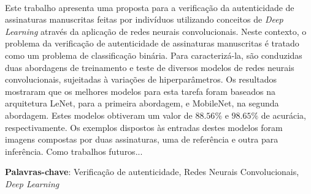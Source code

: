 \ \ \\[2cm]
Este trabalho apresenta uma proposta para a verificação da autenticidade de assinaturas manuscritas feitas por indivíduos utilizando conceitos de \emph{Deep Learning} através da aplicação de redes neurais convolucionais. Neste contexto, o problema da verificação de autenticidade de assinaturas manuscritas é tratado como um problema de classificação binária. Para caracterizá-la, são conduzidas duas abordagens de treinamento e teste de diversos modelos de redes neurais convolucionais, sujeitadas à variações de hiperparâmetros. Os resultados mostraram que os melhores modelos para esta tarefa foram baseados na arquitetura LeNet, para a primeira abordagem, e MobileNet, na segunda abordagem. Estes modelos obtiveram um valor de $88.56\%$ e $98.65\%$ de acurácia, respectivamente. Os exemplos dispostos às entradas destes modelos foram imagens compostas por duas assinaturas, uma de referência e outra para inferência. Como trabalhos futuros...

\textbf{Palavras-chave}: Verificação de autenticidade, Redes Neurais Convolucionais, \emph{Deep Learning}
